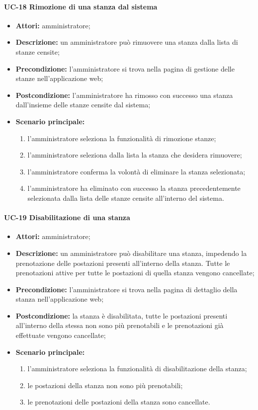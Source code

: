 \paragraph{UC-18 Rimozione di una stanza dal sistema}
\begin{itemize}
    \item \textbf{Attori:} amministratore;
    \item \textbf{Descrizione:} un amministratore pu\`{o} rimuovere una stanza dalla lista di stanze censite;
    \item \textbf{Precondizione:} l'amministratore si trova nella pagina di gestione delle stanze nell'applicazione web;
    \item \textbf{Postcondizione:} l'amministratore ha rimosso con successo una stanza dall'insieme delle stanze censite dal sistema;
    \item \textbf{Scenario principale:}
    \begin{enumerate}
        \item l'amministratore seleziona la funzionalità di rimozione stanze;
        \item l'amministratore seleziona dalla lista la stanza che desidera rimuovere;
        \item l'amministratore conferma la volontà di eliminare la stanza selezionata;
        \item l'amministratore ha eliminato con successo la stanza precedentemente selezionata dalla lista delle stanze censite all'interno del sistema.
    \end{enumerate}
\end{itemize}

\paragraph{UC-19 Disabilitazione di una stanza}
\begin{itemize}
    \item \textbf{Attori:} amministratore;
    \item \textbf{Descrizione:} un amministratore pu\`{o} disabilitare una stanza, impedendo la prenotazione delle postazioni presenti all'interno della stanza. Tutte le prenotazioni attive per tutte le postazioni di quella stanza vengono cancellate;
    \item \textbf{Precondizione:} l'amministratore si trova nella pagina di dettaglio della stanza nell'applicazione web;
    \item \textbf{Postcondizione:} la stanza \`{e} disabilitata, tutte le postazioni presenti all'interno della stessa non sono pi\`{u} prenotabili e le prenotazioni già effettuate vengono cancellate;
    \item \textbf{Scenario principale:}
    \begin{enumerate}
        \item l'amministratore seleziona la funzionalità di disabilitazione della stanza;
        \item le postazioni della stanza non sono pi\`{u} prenotabili;
        \item le prenotazioni delle postazioni della stanza sono cancellate.
    \end{enumerate}
\end{itemize}

